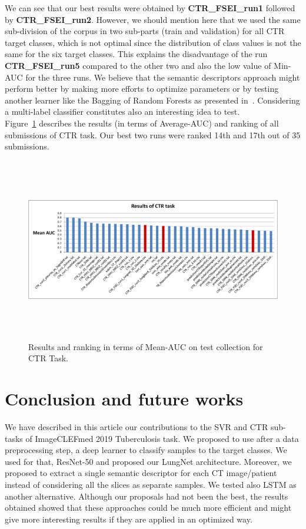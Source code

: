 \documentclass{llncs}
\begin{document}
We can see that our best results were obtained by  \textbf{CTR\_FSEI\_run1} followed by  \textbf{CTR\_FSEI\_run2}. However, we should mention here that we used the same sub-division of the corpus in two sub-parts (train and validation) for all CTR target classes, which is not optimal since the distribution of class values is not the same for the six target classes. This explains the disadvantage of the run \textbf{CTR\_FSEI\_run5} compared to the other two and also the low value of Min-AUC for the three runs. We believe that the semantic descriptors approach might perform better by making more efforts to optimize parameters or by testing another learner like the Bagging of Random Forests as presented in~\cite{HamadiY18}. Considering a multi-label classifier constitutes also an interesting idea to test.\\

Figure~\ref{fig:ctrresultsauc} describes the results (in terms of Average-AUC) and ranking of all submissions of CTR task. Our best two runs were ranked 14th and 17th out of 35 submissions.\\

\begin{figure}[!ht]
\includegraphics[width=12cm,height=8cm]{results_ctr_test_meanauc.pdf}
\caption{Results and ranking in terms of Mean-AUC on test collection for CTR Task.} 
\label{fig:ctrresultsauc}
\end{figure}



\section{Conclusion and future works}

We have described in this article our contributions to the SVR and CTR sub-tasks of ImageCLEFmed 2019 Tuberculosis task. We proposed to use after a data preprocessing step, a deep learner to classify samples to the target classes. We used for that, ResNet-50 and proposed our LungNet architecture. Moreover, we proposed to extract a single semantic descriptor for each CT image/patient instead of considering all the slices as separate samples. We tested also LSTM as another alternative. Although our proposals had not been the best, the results obtained showed that these approaches could be much more efficient and might give more interesting results if they are applied in an optimized way.\\
\end{document}
